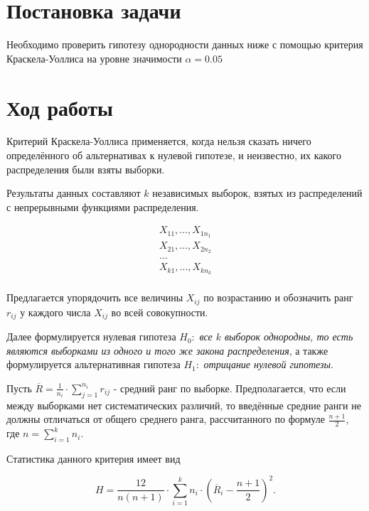 \section{Постановка задачи}

Необходимо проверить гипотезу однородности данных ниже с помощью критерия Краскела-Уоллиса на уровне значимости $\alpha = 0.05$


\section{Ход работы}

Критерий Краскела-Уоллиса применяется, когда нельзя сказать ничего определённого об альтернативах к нулевой гипотезе, и неизвестно, их какого распределения были взяты выборки.

Результаты данных составляют $k$ независимых выборок, взятых из распределений с непрерывными функциями распределения.

\begin{equation}
	\begin{matrix}
		X_{11}, \ldots, X_{1n_1} \\
		X_{21}, \ldots, X_{2n_2} \\
		\ldots \\
		X_{k1}, \ldots, X_{kn_k} \\
	\end{matrix}
\end{equation}

Предлагается упорядочить все величины $X_{ij}$ по возрастанию и обозначить ранг $r_{ij}$ у каждого числа $X_{ij}$ во всей совокупности.

Далее формулируется нулевая гипотеза $H_0:$ \textit{все $k$ выборок однородны, то есть являются выборками из одного и того же закона распределения}, а также формулируется альтернативная гипотеза $H_1:$ \textit{отрицание нулевой гипотезы}.

Пусть $\overline{R} = \frac{1}{n_i} \cdot \sum\limits_{j=1}^{n_i} r_{ij}$ - средний ранг по выборке. Предполагается, что если между выборками нет систематических различий, то введённые средние ранги не должны отличаться от общего среднего ранга, рассчитанного по формуле $\frac{n + 1}{2}$, где $n = \sum\limits_{i=1}^k n_i$.

Статистика данного критерия имеет вид

\begin{equation}
	H = \frac{12}{n(n + 1)} \cdot \sum\limits_{i=1}^k n_i \cdot \left(\overline{R}_i - \frac{n + 1}{2}\right)^2.
\end{equation}

